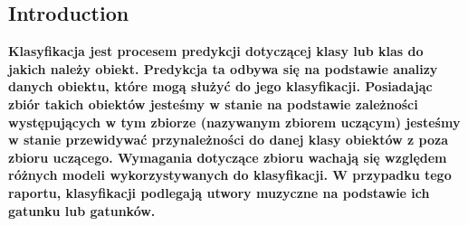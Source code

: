 \begin{multicols}{2}
\tableofcontents
\section{Introduction}
\textbf{ Klasyfikacja jest procesem predykcji dotyczącej klasy 
lub klas do jakich należy obiekt. Predykcja ta odbywa 
się na podstawie analizy danych obiektu, które mogą służyć do jego
 klasyfikacji. Posiadając zbiór takich obiektów jesteśmy w stanie na 
 podstawie zależności występujących w tym zbiorze (nazywanym zbiorem uczącym)
  jesteśmy w stanie przewidywać przynależności do danej klasy obiektów z poza
   zbioru uczącego. Wymagania dotyczące zbioru wachają się względem różnych 
   modeli wykorzystywanych do klasyfikacji. W przypadku tego raportu, klasyfikacji
    podlegają utwory muzyczne na podstawie ich gatunku lub gatunków.
}
\end{multicols}